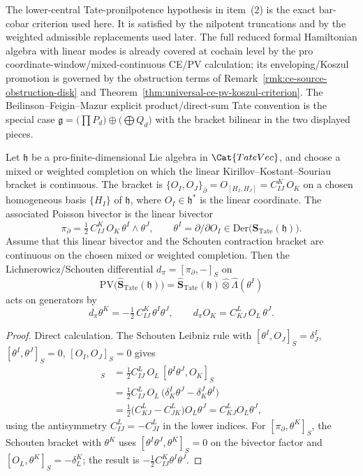 \documentclass[11pt]{memoir}
\begin{document}
\begin{rmk}
  The lower-central Tate-pronilpotence hypothesis in item~(2) is the
  exact bar-cobar criterion used here. It is satisfied by the nilpotent
  truncations and by the weighted admissible replacements used later.  The full reduced formal
  Hamiltonian algebra with linear modes is already covered at cochain
	  level by the pro coordinate-window/mixed-continuous CE/PV calculation; its
  enveloping/Koszul
  promotion is governed by the obstruction terms of
  Remark~\ref{rmk:ce-source-obstruction-disk} and
  Theorem~\ref{thm:universal-ce-pv-koszul-criterion}. The
  Beilinson--Feigin--Mazur explicit product/direct-sum Tate convention
  \cite{beilinson-feigin-mazur} is the special case
  $\mathfrak g=\bigl(\prod P_d\bigr)\oplus\bigl(\bigoplus Q_d\bigr)$
  with the bracket bilinear in the two displayed pieces.
\end{rmk}

\begin{lem}\label{lem:linear-poisson-schouten}
  Let $\mathfrak h$ be a pro-finite-dimensional Lie algebra in
  $\Cat{TateVec}$, and choose a mixed or weighted completion on which the
  linear Kirillov--Kostant--Souriau bracket is continuous.  The bracket is
  $\{O_I,O_J\}_\partial=O_{[H_I,H_J]}=C^K_{IJ}\,O_K$ on a chosen
  homogeneous basis $\{H_I\}$ of $\mathfrak h$, where
  $O_I\in\mathfrak h^*$ is the linear coordinate. The associated
  Poisson bivector is the linear bivector
  $$\pi_\partial=\tfrac12\,C^K_{IJ}\,O_K\,\theta^I\wedge\theta^J,
    \qquad \theta^I=\partial/\partial O_I\in\mathrm{Der}\bigl(
    \widehat{\mathbf S}_{\mathrm{Tate}}(\mathfrak h)\bigr).$$
  Assume that this linear bivector and the Schouten contraction bracket
  are continuous on the chosen mixed or weighted completion.  Then the
  Lichnerowicz/Schouten differential
  $d_\pi=[\pi_\partial,-]_S$ on
  $$\mathrm{PV}\bigl(\widehat{\mathbf S}_{\mathrm{Tate}}(\mathfrak h)\bigr)=
    \widehat{\mathbf S}_{\mathrm{Tate}}(\mathfrak h)\widehat\otimes
    \widehat\Lambda(\theta^I)$$
  acts on generators by
  $$d_\pi\theta^K=-\tfrac12\,C^K_{IJ}\,\theta^I\theta^J,\qquad
    d_\pi O_K=C^L_{KJ}\,O_L\,\theta^J.$$
\end{lem}

\begin{proof}
  Direct calculation. The Schouten Leibniz rule with
  $[\theta^I,O_J]_S=\delta^I_J$, $[\theta^I,\theta^J]_S=0$,
  $[O_I,O_J]_S=0$ gives
  \begin{align*}
    [\pi_\partial,O_K]_S
    &=\tfrac12 C^L_{IJ}\,O_L\,[\theta^I\theta^J,O_K]_S\\
    &=\tfrac12 C^L_{IJ}\,O_L\,
      \bigl(\delta^I_K\theta^J-\delta^J_K\theta^I\bigr)\\
    &=\tfrac12\bigl(C^L_{KJ}-C^L_{JK}\bigr)O_L\theta^J
     =C^L_{KJ}O_L\theta^J,
  \end{align*}
  using the antisymmetry $C^L_{IJ}=-C^L_{JI}$ in the lower indices.
  For $[\pi_\partial,\theta^K]_S$, the Schouten bracket with $\theta^K$
  uses $[\theta^I\theta^J,\theta^K]_S=0$ on the bivector factor and
  $[O_L,\theta^K]_S=-\delta^K_L$; the result is
  $-\tfrac12 C^K_{IJ}\theta^I\theta^J$.
\end{proof}
\end{document}
